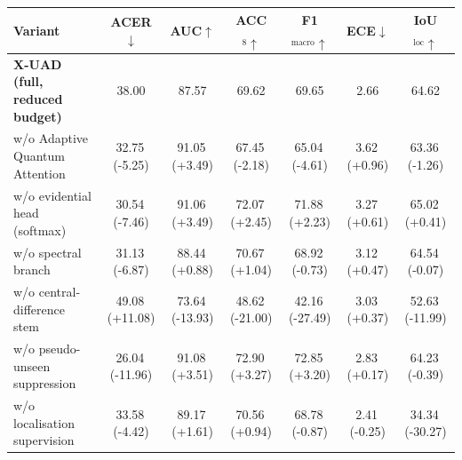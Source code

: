 \begin{tabular}{lcccccc}
\toprule
Variant & ACER$\downarrow$ & AUC$\uparrow$ & ACC$_8\uparrow$ & F1$_{\text{macro}}\uparrow$ & ECE$\downarrow$ & IoU$_{\text{loc}}\uparrow$ \\
\midrule
\textbf{X-UAD (full, reduced budget)} & 38.00 & 87.57 & 69.62 & 69.65 & 2.66 & 64.62 \\
\midrule
\quad w/o Adaptive Quantum Attention & 32.75\,\tiny{(-5.25)} & 91.05\,\tiny{(+3.49)} & 67.45\,\tiny{(-2.18)} & 65.04\,\tiny{(-4.61)} & 3.62\,\tiny{(+0.96)} & 63.36\,\tiny{(-1.26)} \\
\quad w/o evidential head (softmax) & 30.54\,\tiny{(-7.46)} & 91.06\,\tiny{(+3.49)} & 72.07\,\tiny{(+2.45)} & 71.88\,\tiny{(+2.23)} & 3.27\,\tiny{(+0.61)} & 65.02\,\tiny{(+0.41)} \\
\quad w/o spectral branch & 31.13\,\tiny{(-6.87)} & 88.44\,\tiny{(+0.88)} & 70.67\,\tiny{(+1.04)} & 68.92\,\tiny{(-0.73)} & 3.12\,\tiny{(+0.47)} & 64.54\,\tiny{(-0.07)} \\
\quad w/o central-difference stem & 49.08\,\tiny{(+11.08)} & 73.64\,\tiny{(-13.93)} & 48.62\,\tiny{(-21.00)} & 42.16\,\tiny{(-27.49)} & 3.03\,\tiny{(+0.37)} & 52.63\,\tiny{(-11.99)} \\
\quad w/o pseudo-unseen suppression & 26.04\,\tiny{(-11.96)} & 91.08\,\tiny{(+3.51)} & 72.90\,\tiny{(+3.27)} & 72.85\,\tiny{(+3.20)} & 2.83\,\tiny{(+0.17)} & 64.23\,\tiny{(-0.39)} \\
\quad w/o localisation supervision & 33.58\,\tiny{(-4.42)} & 89.17\,\tiny{(+1.61)} & 70.56\,\tiny{(+0.94)} & 68.78\,\tiny{(-0.87)} & 2.41\,\tiny{(-0.25)} & 34.34\,\tiny{(-30.27)} \\
\bottomrule
\end{tabular}
